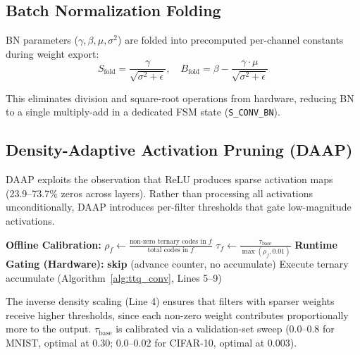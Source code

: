 \documentclass[conference]{IEEEtran}
\begin{document}
\subsection{Batch Normalization Folding}

BN parameters ($\gamma, \beta, \mu, \sigma^2$) are folded into precomputed per-channel constants during weight export:
\begin{equation}
S_{\text{fold}} = \frac{\gamma}{\sqrt{\sigma^2 + \epsilon}}, \quad B_{\text{fold}} = \beta - \frac{\gamma \cdot \mu}{\sqrt{\sigma^2 + \epsilon}}
\end{equation}

This eliminates division and square-root operations from hardware, reducing BN to a single multiply-add in a dedicated FSM state (\texttt{S\_CONV\_BN}).

\subsection{Density-Adaptive Activation Pruning (DAAP)}
\label{sec:daap}

DAAP exploits the observation that ReLU produces sparse activation maps (23.9--73.7\% zeros across layers). Rather than processing all activations unconditionally, DAAP introduces per-filter thresholds that gate low-magnitude activations.

\begin{algorithm}[H]
\caption{DAAP Threshold Computation and Gating}
\label{alg:daap}
\begin{algorithmic}[1]
\STATE \textbf{Offline Calibration:}
    \STATE $\rho_f \gets \frac{\text{non-zero ternary codes in } f}{\text{total codes in } f}$ 
    \STATE $\tau_f \gets \frac{\tau_{\text{base}}}{\max(\rho_f, 0.01)}$ 
\ENDFOR
\STATE \textbf{Runtime Gating (Hardware):}
        \STATE \textbf{skip} (advance counter, no accumulate)
    \ELSE
        \STATE Execute ternary accumulate (Algorithm~\ref{alg:ttq_conv}, Lines 5--9)
    \ENDIF
\ENDFOR
\end{algorithmic}
\end{algorithm}

The inverse density scaling (Line 4) ensures that filters with sparser weights receive higher thresholds, since each non-zero weight contributes proportionally more to the output. $\tau_{\text{base}}$ is calibrated via a validation-set sweep (0.0--0.8 for MNIST, optimal at 0.30; 0.0--0.02 for CIFAR-10, optimal at 0.003).
\end{document}
